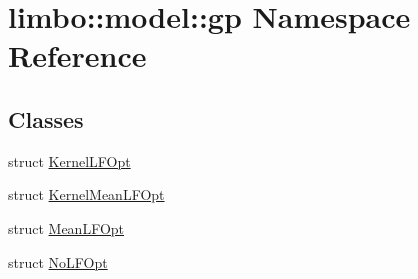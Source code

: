 \hypertarget{namespacelimbo_1_1model_1_1gp}{}\section{limbo\+:\+:model\+:\+:gp Namespace Reference}
\label{namespacelimbo_1_1model_1_1gp}
\subsection*{Classes}
\begin{DoxyCompactItemize}
\item 
struct \hyperlink{structlimbo_1_1model_1_1gp_1_1_kernel_l_f_opt}{Kernel\+L\+F\+Opt}
\item 
struct \hyperlink{structlimbo_1_1model_1_1gp_1_1_kernel_mean_l_f_opt}{Kernel\+Mean\+L\+F\+Opt}
\item 
struct \hyperlink{structlimbo_1_1model_1_1gp_1_1_mean_l_f_opt}{Mean\+L\+F\+Opt}
\item 
struct \hyperlink{structlimbo_1_1model_1_1gp_1_1_no_l_f_opt}{No\+L\+F\+Opt}
\end{DoxyCompactItemize}
